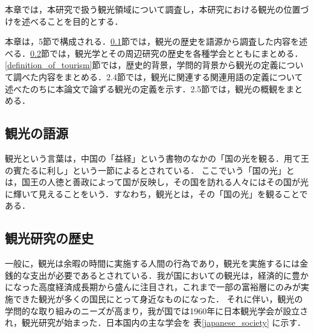 \documentclass{jsarticle}
\begin{document}
本章では，本研究で扱う観光領域について調査し，本研究における観光の位置づけを述べることを目的とする．

本章は，5節で構成される．\ref{history_of_tourism}節では，観光の歴史を語源から調査した内容を述べる．\ref{history_of_tourism_study}節では，観光学とその周辺研究の歴史を各種学会とともにまとめる．\ref{definition_of_tourism}節では，歴史的背景，学問的背景から観光の定義について調べた内容をまとめる．2.4節では，観光に関連する関連用語の定義について述べたのちに本論文で論ずる観光の定義を示す．2.5節では，観光の概観をまとめる．

\newpage

\subsection{観光の語源}

\label{history_of_tourism}

観光という言葉は，中国の「益経」という書物のなかの「国の光を観る．用て王の賓たるに利し」という一節によるとされている\cite{kanko_define}．
ここでいう「国の光」とは，国王の人徳と善政によって国が反映し，その国を訪れる人々にはその国が光に輝いて見えることをいう．すなわち，観光とは，その「国の光」を観ることである．

\subsection{観光研究の歴史}

\label{history_of_tourism_study}

一般に，観光は余暇の時間に実施する人間の行為であり，観光を実施するには金銭的な支出が必要であるとされている．我が国においての観光は，経済的に豊かになった高度経済成長期から盛んに注目され，これまで一部の富裕層にのみが実施できた観光が多くの国民にとって身近なものになった．
それに伴い，観光の学問的な取り組みのニーズが高まり，我が国では1960年に日本観光学会が設立され，観光研究が始まった．日本国内の主な学会を 表\ref{japanese_society} に示す．
\end{document}
